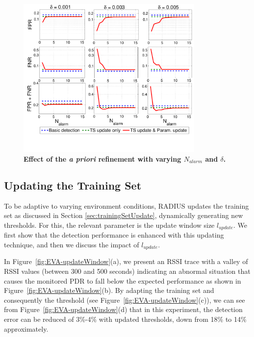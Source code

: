 \begin{figure}[t]
	\centering
	\includegraphics[width=1.0\linewidth, height = 8cm]{7-Find_AlarmNum_and_AdjustStep-WithPerson-nonLoS-L1R3-makeup2-v2}
	\vspace{-1.5cm}
	\caption{\textbf{Effect of the \textit{a priori} refinement with varying $N_{alarm}$ and $\delta$.}}
	\label{fig:EVA-paramRefine}
	\vspace{-0.65cm}
\end{figure}

\subsection{Updating the Training Set} \label{sec:evaParamTrainingUpdate}

To be adaptive to varying environment conditions, RADIUS updates the training set as discussed in Section \ref{sec:trainingSetUpdate}, dynamically generating new thresholds. For this, the relevant parameter is the update window size $l_{update}$. We first show that the detection performance is enhanced with this updating technique, and then we discuss the impact of $l_{update}$.

In Figure~\ref{fig:EVA-updateWindow}(a), we present an RSSI trace with a valley of RSSI values (between 300 and 500 seconds) indicating an abnormal situation that causes the monitored PDR to fall below the expected performance as shown in Figure~\ref{fig:EVA-updateWindow}(b). By adapting the training set and consequently the threshold (see Figure~\ref{fig:EVA-updateWindow}(c)), we can see from Figure~\ref{fig:EVA-updateWindow}(d) that in this experiment, the detection error can be reduced of 3\%-4\% with updated thresholds, down from 18\% to 14\% approximately.

